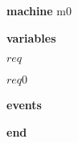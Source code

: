 \begin{block}
  \item   \textbf{machine} m0
  \item   \textbf{variables}
  \begin{block}
    \item   $req$
    \item   $req0$
  \end{block}
  \item   
  \item   
  \item   \textbf{events}
  \begin{block}
    \item   
    \item   
  \end{block}
  \item   \textbf{end} \\
\end{block}
